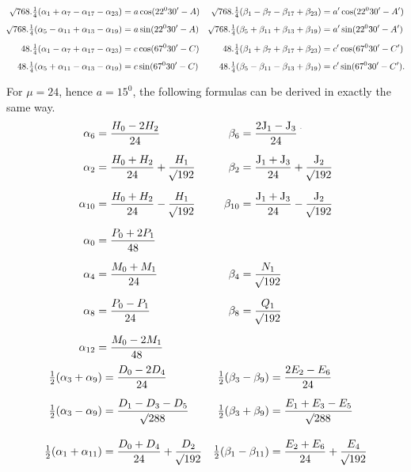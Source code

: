\begin{landscape}
\[\begin{aligned}
\mathord{{}^{}\!\surd}768\mathord{.}\tfrac14(\alpha_1+\alpha_7-\alpha_{17}-\alpha_{23})&=a\cos(22^0 30'-A)&\mathord{{}^{}\!\surd}768\mathord{.}\tfrac14(\beta_1-\beta_7-\beta_{17}+\beta_{23})&=a'\cos(22^0 30'-A')\\[4pt]
\mathord{{}^{}\!\surd}768\mathord{.}\tfrac14(\alpha_5-\alpha_{11}+\alpha_{13}-\alpha_{19})&=a\sin(22^0 30'-A)&\mathord{{}^{}\!\surd}768\mathord{.}\tfrac14(\beta_5+\beta_{11}+\beta_{13}+\beta_{19})&=a'\sin(22^0 30'-A')\\[6pt]
48\mathord{.}\tfrac14(\alpha_1-\alpha_7+\alpha_{17}-\alpha_{23})&=c\cos(67^0 30'-C)&48\mathord{.}\tfrac14(\beta_1+\beta_7+\beta_{17}+\beta_{23})&=c'\cos(67^0 30'-C')\\[4pt]
48\mathord{.}\tfrac14(\alpha_5+\alpha_{11}-\alpha_{13}-\alpha_{19})&=c\sin(67^0 30'-C)&48\mathord{.}\tfrac14(\beta_5-\beta_{11}-\beta_{13}+\beta_{19})&=c'\sin(67^0 30'-C').
\end{aligned}
\]
\par\noindent\hspace*{\parindent}For \(\mu=24\), hence \(a=15^0\), the following formulas can be derived in exactly the same way.
\[
\begin{aligned}
\alpha_6&=\frac{H_0-2H_2}{24}&\qquad\beta_6&=\frac{2\mathrm{J}_1-\mathrm{J}_3}{24}\VthreeUpperMark\\[6pt]
\alpha_2&=\frac{H_0+H_2}{24}+\frac{H_1}{\BareRoot{192}}&\beta_2&=\frac{\mathrm{J}_1+\mathrm{J}_3}{24}+\frac{\mathrm{J}_2}{\BareRoot{192}}\\[6pt]
\alpha_{10}&=\frac{H_0+H_2}{24}-\frac{H_1}{\BareRoot{192}}&\beta_{10}&=\frac{\mathrm{J}_1+\mathrm{J}_3}{24}-\frac{\mathrm{J}_2}{\BareRoot{192}}\\[6pt]
\alpha_0&=\frac{P_0+2P_1}{48}&&\\[6pt]
\alpha_4&=\frac{M_0+M_1}{24}&\beta_4&=\frac{N_1}{\BareRoot{192}}\\[6pt]
\alpha_8&=\frac{P_0-P_1}{24}&\beta_8&=\frac{Q_1}{\BareRoot{192}}\\[6pt]
\alpha_{12}&=\frac{M_0-2M_1}{48}&&
\end{aligned}
\]
\clearpage
\[
\begin{aligned}
\tfrac12(\alpha_3+\alpha_9)&=\frac{D_0-2D_4}{24}&\tfrac12(\beta_3-\beta_9)&=\frac{2E_2-E_6}{24}\\[6pt]
\tfrac12(\alpha_3-\alpha_9)&=\frac{D_1-D_3-D_5}{\BareRoot{288}}&\tfrac12(\beta_3+\beta_9)&=\frac{E_1+E_3-E_5}{\BareRoot{288}}\\[10pt]
\tfrac12(\alpha_1+\alpha_{11})&=\frac{D_0+D_4}{24}+\frac{D_2}{\BareRoot{192}}&\tfrac12(\beta_1-\beta_{11})&=\frac{E_2+E_6}{24}+\frac{E_4}{\BareRoot{192}}\\[6pt]

\end{aligned}\]
\end{landscape}
